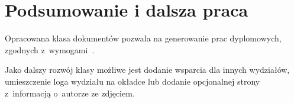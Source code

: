 \chapter{Podsumowanie i dalsza praca}
Opracowana klasa dokumentów pozwala na generowanie prac dyplomowych, zgodnych z~wymogami~\cite{UWM}.

Jako dalszy rozwój klasy możliwe jest dodanie wsparcia dla innych wydziałów, umieszczenie loga wydziału na okładce lub dodanie opcjonalnej strony z~informacją o~autorze ze zdjęciem.
